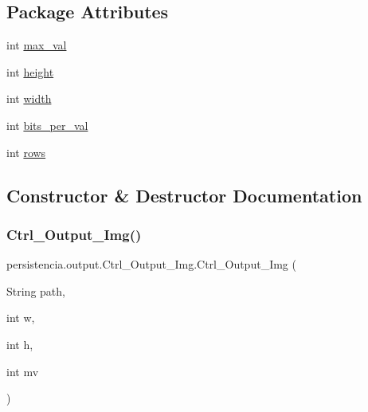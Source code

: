 \subsection*{Package Attributes}
\begin{DoxyCompactItemize}
\item 
int \hyperlink{classpersistencia_1_1output_1_1Ctrl__Output__Img_ab9e685dae026afe43188c62d7c4fad53}{max\+\_\+val}
\item 
int \hyperlink{classpersistencia_1_1output_1_1Ctrl__Output__Img_a1d7bc52c64c79e8545ae6d1ae8b9ee2e}{height}
\item 
int \hyperlink{classpersistencia_1_1output_1_1Ctrl__Output__Img_ae4a01ec459078cece4815d2fe7db8a64}{width}
\item 
int \hyperlink{classpersistencia_1_1output_1_1Ctrl__Output__Img_ad40e63d16abd9058889249f5ad84f200}{bits\+\_\+per\+\_\+val}
\item 
int \hyperlink{classpersistencia_1_1output_1_1Ctrl__Output__Img_a586ee8128a26b6786471e040a705bdbc}{rows}
\end{DoxyCompactItemize}


\subsection{Constructor \& Destructor Documentation}
\mbox{\label{classpersistencia_1_1output_1_1Ctrl__Output__Img_aa3f2948dd4645d8b121eedf30daa0c3f}} 
\subsubsection{\texorpdfstring{Ctrl\+\_\+\+Output\+\_\+\+Img()}{Ctrl\_Output\_Img()}}
{\footnotesize\ttfamily persistencia.\+output.\+Ctrl\+\_\+\+Output\+\_\+\+Img.\+Ctrl\+\_\+\+Output\+\_\+\+Img (\begin{DoxyParamCaption}\item[{String}]{path,  }\item[{int}]{w,  }\item[{int}]{h,  }\item[{int}]{mv }\end{DoxyParamCaption})\hspace{0.3cm}{\ttfamily [inline]}}



